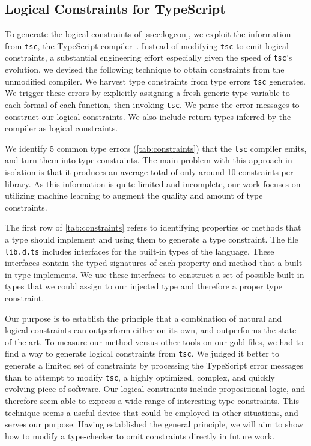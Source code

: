 \documentclass[sigplan,10pt,review,anonymous]{acmart} %
\theoremstyle{plain}
\theoremstyle{remark}
\theoremstyle{definition}
\begin{document}
\subsection{Logical Constraints for TypeScript}
\label{ssec:logprodts}

To generate the logical constraints of \cref{ssec:logcon}, we exploit the information from \lstinline+tsc+, the TypeScript compiler~\cite{typescript}.
%
Instead of modifying \lstinline+tsc+ to emit logical constraints, a substantial
engineering effort especially given the speed of \lstinline+tsc+'s evolution,
we devised the following technique to obtain constraints from the unmodified compiler.
%
We harvest type constraints from type errors \lstinline+tsc+ generates.  We trigger
these errors by explicitly assigning a fresh generic type variable to
each formal of each function, then invoking \lstinline+tsc+.
%
We parse the error messages to construct our logical constraints.
%
We also include return types inferred by the compiler as logical constraints.
%

We identify 5 common type errors (\cref{tab:constraints}) that the \texttt{tsc}
compiler emits, and turn them into type constraints. The main problem with
this approach in isolation is that it produces an average total
of only around 10 constraints per library. As this information is quite
limited and incomplete, our work focuses on utilizing machine learning to augment
the quality and amount of type constraints.

The first row of \cref{tab:constraints}
refers to identifying properties or methods that a type should implement
and using them to generate a type constraint.
The file \lstinline{lib.d.ts} includes interfaces for the built-in types of the language.
These interfaces contain the typed signatures of each property and method
that a built-in type implements. We use these interfaces to construct a set of
possible built-in types that we could assign to our injected type and therefore a proper
type constraint.

Our purpose is to establish the principle that a combination of natural and logical constraints can outperform either on its own, and outperforms the state-of-the-art.
%
To measure our method versus other tools on our gold files, we had to find a way to generate logical constraints from \lstinline+tsc+.
%
We judged it better to generate a limited set of constraints by processing the
TypeScript error messages than to attempt to modify \lstinline+tsc+, a highly optimized, complex, and quickly evolving piece of software.
%
Our logical constraints include propositional logic, and therefore seem able to express a wide range of interesting type constraints.
%
This technique seems a useful device that could be employed in other situations, and serves our purpose.
%
Having established the general principle, we will aim to show how to modify a type-checker to omit constraints directly in future work.
\end{document}
